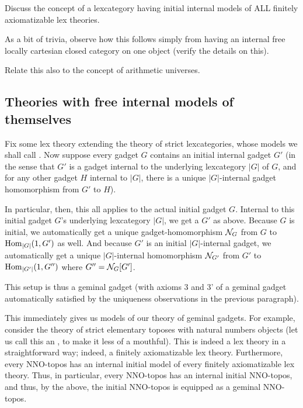 \begin{TODOblock}
Discuss the concept of a lexcategory having initial internal models of ALL finitely axiomatizable lex theories.

As a bit of trivia, observe how this follows simply from having an internal free locally cartesian closed category on one object (verify the details on this). 

Relate this also to the concept of arithmetic universes.
\end{TODOblock}

\subsection{Theories with free internal models of themselves}
Fix some lex theory extending the theory of strict lexcategories, whose models we shall call . Now suppose every gadget $G$ contains an initial internal gadget $G'$ (in the sense that $G'$ is a gadget internal to the underlying lexcategory $|G|$ of $G$, and for any other gadget $H$ internal to $|G|$, there is a unique $|G|$-internal gadget homomorphism from $G'$ to $H$).

In particular, then, this all applies to the actual initial gadget $G$. Internal to this initial gadget $G$'s underlying lexcategory $|G|$, we get a $G'$ as above. Because $G$ is initial, we automatically get a unique gadget-homomorphism $\mathcal{N}_{G}$ from $G$ to $\operatorname{Hom}_{|G|}(1, G')$ as well. And because $G'$ is an initial $|G|$-internal gadget, we automatically get a unique $|G|$-internal homomorphism $\mathcal{N}_{G'}$ from $G'$ to $\operatorname{Hom}_{|G'|}(1, G'')$ where $G'' = \mathcal{N}_{G}[G']$.

This setup is thus a geminal gadget (with axioms 3 and 3' of a geminal gadget automatically satisfied by the uniqueness observations in the previous paragraph).

This immediately gives us models of our theory of geminal gadgets. For example, consider the theory of strict elementary toposes with natural numbers objects (let us call this an , to make it less of a mouthful). This is indeed a lex theory in a straightforward way; indeed, a finitely axiomatizable lex theory. Furthermore, every NNO-topos has an internal initial model of every finitely axiomatizable lex theory. Thus, in particular, every NNO-topos has an internal initial NNO-topos, and thus, by the above, the initial NNO-topos is equipped as a geminal NNO-topos.


